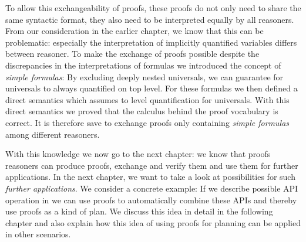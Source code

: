 To allow this exchangeability of proofs, these proofs do not only need to share the same syntactic format, they also need to be interpreted equally by all reasoners. 
From our consideration in the earlier chapter, we know that this can be problematic: especially the interpretation of implicitly quantified variables differs between reasoner.
To make the exchange of proofs possible despite the discrepancies in the interpretations of \nthree formulas we 
introduced the concept of \emph{simple formulas}: By excluding deeply nested universals,  we can guarantee for universals to  always quantified on top level. For these formulas 
we then defined a direct semantics which assumes to level quantification for universals. With this direct semantics we proved that the calculus behind the proof vocabulary is correct.
It is therefore save to exchange proofs only containing \emph{simple formulas} among different reasoners.

With this knowledge we now go to the next chapter: we know that proofs \nthree reasoners can produce proofs, exchange and verify them and use them for further applications. 
In the next chapter, we want to take a look at possibilities for such \emph{further applications}. We consider a concrete example: If we describe possible API operation in \nthree we can 
use proofs to automatically combine these APIs and thereby use proofs as a kind of plan. We discuss this idea in detail in the following chapter and also explain how this  idea of 
using proofs for planning can be applied in other scenarios.

